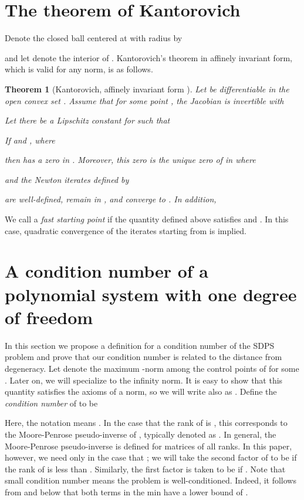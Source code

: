\documentclass{article}
\newcommand\eref[1]{}
\newtheorem{theorem}{Theorem}[section]
\begin{document}
\section{The theorem of Kantorovich}
\label{sec:kanto}

Denote the closed ball centered at  with radius  by

and let  denote the interior of .
Kantorovich's theorem in affinely invariant form, which is valid for
any norm, is as follows.

\begin{theorem}[Kantorovich, affinely invariant form \cite{deuflhard,kantorovich}]
\label{standardkantorovich}
Let  be differentiable in
the open convex set . Assume that for some point , the Jacobian 
is invertible with

Let there be a Lipschitz constant  for  such that

If  and , where

then  has a zero  in . Moreover, this zero is the unique zero
of  in  where

and the Newton iterates  defined by

are well-defined, remain in , and converge to . In addition,

\end{theorem}
We call  a \emph{fast starting point} if the quantity 
defined above satisfies  and .  In this case, quadratic convergence of the iterates
starting from  is implied.


\section{A condition number of a polynomial system with one degree of freedom}
\label{section_cond}

In this section we propose a definition for a condition number of the SDPS problem and prove that our condition number is related to the distance
from degeneracy.  Let  denote the maximum -norm among the control points of  for some .  
Later on, we will specialize to the infinity norm.
It is easy to show that this quantity satisfies
the axioms of a norm, so we will write  also as .
Define the {\em condition number} of  to be

Here, the notation 
means .  In the case that
the rank of  is , this corresponds to the Moore-Penrose
pseudo-inverse of , typically denoted as .  In general,
the Moore-Penrose pseudo-inverse is defined for matrices of all ranks.
In this paper, however, we need  only in the case that
; we will 
take the second factor  of \eref{cond_def}
to be  if the rank of  is
less than .
Similarly, the first factor is taken to be  if .
Note that small condition number means the problem is
well-conditioned.
Indeed, it follows
from \eref{eq:fMbound} and \eref{eq:Mpinvineq} below
that both terms in the min have a lower bound of  .
\end{document}
